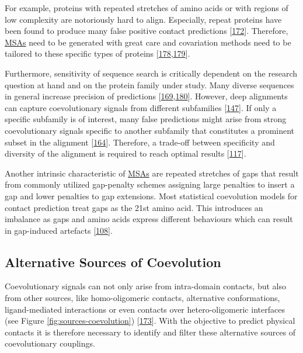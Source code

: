 \documentclass[11pt,a4paper,twoside]{book}
\theoremstyle{definition}
\theoremstyle{definition}
\theoremstyle{remark}
\begin{document}
For example, proteins with repeated stretches of amino acids or with
regions of low complexity are notoriously hard to align. Especially,
repeat proteins have been found to produce many false positive contact
predictions {[}\protect\hyperlink{ref-Anishchenko2017}{172}{]}.
Therefore, \protect\hyperlink{abbrev}{MSAs} need to be generated with
great care and covariation methods need to be tailored to these specific
types of proteins
{[}\protect\hyperlink{ref-Espada2014}{178},\protect\hyperlink{ref-Toth-Petroczy2016}{179}{]}.

Furthermore, sensitivity of sequence search is critically dependent on
the research question at hand and on the protein family under study.
Many diverse sequences in general increase precision of predictions
{[}\protect\hyperlink{ref-Ashkenazy2009}{169},\protect\hyperlink{ref-Avila-Herrera2015a}{180}{]}.
However, deep alignments can capture coevolutionary signals from
different subfamilies {[}\protect\hyperlink{ref-Uguzzoni2017}{147}{]}.
If only a specific subfamily is of interest, many false predictions
might arise from strong coevolutionary signals specific to another
subfamily that constitutes a prominent subset in the alignment
{[}\protect\hyperlink{ref-Franceus2016}{164}{]}. Therefore, a trade-off
between specificity and diversity of the alignment is required to reach
optimal results {[}\protect\hyperlink{ref-Hopf2012}{117}{]}.

Another intrinsic characteristic of \protect\hyperlink{abbrev}{MSAs} are
repeated stretches of gaps that result from commonly utilized
gap-penalty schemes assigning large penalties to insert a gap and lower
penalties to gap extensions. Most statistical coevolution models for
contact prediction treat gaps as the 21st amino acid. This introduces an
imbalance as gaps and amino acids express different behaviours which can
result in gap-induced artefacts
{[}\protect\hyperlink{ref-Feinauer2014}{108}{]}.

\subsection{Alternative Sources of
Coevolution}\label{alternative-sources-of-coevolution}

Coevolutionary signals can not only arise from intra-domain contacts,
but also from other sources, like homo-oligomeric contacts, alternative
conformations, ligand-mediated interactions or even contacts over
hetero-oligomeric interfaces (see Figure \ref{fig:sources-coevolution})
{[}\protect\hyperlink{ref-Marks2012}{173}{]}. With the objective to
predict physical contacts it is therefore necessary to identify and
filter these alternative sources of coevolutionary couplings.
\end{document}
